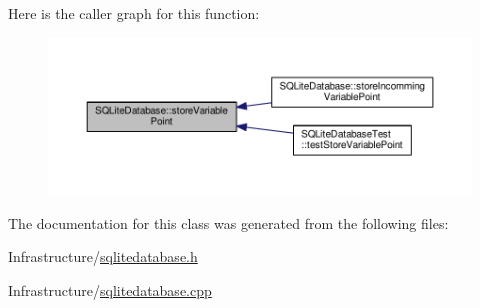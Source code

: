 Here is the caller graph for this function\+:
\nopagebreak
\begin{figure}[H]
\begin{center}
\leavevmode
\includegraphics[width=350pt]{class_s_q_lite_database_aed2925c70c2e3b3444991dd62dfeaabf_icgraph}
\end{center}
\end{figure}




The documentation for this class was generated from the following files\+:\begin{DoxyCompactItemize}
\item 
Infrastructure/\hyperlink{sqlitedatabase_8h}{sqlitedatabase.\+h}\item 
Infrastructure/\hyperlink{sqlitedatabase_8cpp}{sqlitedatabase.\+cpp}\end{DoxyCompactItemize}

